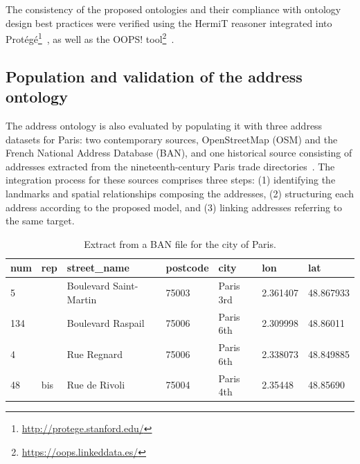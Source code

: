 The consistency of the proposed ontologies and their compliance with ontology design best practices were verified using the HermiT reasoner integrated into Protégé\footnote{\url{http://protege.stanford.edu/}}~\cite{musen_protege_2015}, as well as the OOPS! tool\footnote{\url{https://oops.linkeddata.es/}}~\cite{poveda-villalon_oops_2014}.

\subsection{Population and validation of the address ontology}

The address ontology is also evaluated by populating it with three address datasets for Paris: two contemporary sources, OpenStreetMap (OSM) and the French National Address Database (BAN), and one historical source consisting of addresses extracted from the nineteenth-century Paris trade directories~\cite{abadie_benchmark_2022}. The integration process for these sources comprises three steps: (1) identifying the landmarks and spatial relationships composing the addresses, (2) structuring each address according to the proposed model, and (3) linking addresses referring to the same target.

\begin{table}[htbp]
    \centering
    \begin{tabular}{|l|l|l|l|l|l|l|}
    \hline
        num & rep & street\_name & postcode & city & lon & lat \\ \hline
        5 & & Boulevard Saint-Martin & 75003 & Paris 3rd & 2.361407 & 48.867933 \\
        134 & & Boulevard Raspail & 75006 & Paris 6th & 2.309998 & 48.86011 \\
        4 & & Rue Regnard & 75006 & Paris 6th & 2.338073 & 48.849885 \\
        48 & bis & Rue de Rivoli & 75004 & Paris 4th & 2.35448 & 48.85690 \\ \hline
    \end{tabular}
    \caption{Extract from a BAN file for the city of Paris\protect\footnotemark.}
    \label{tab:ban_sample}
\end{table}


